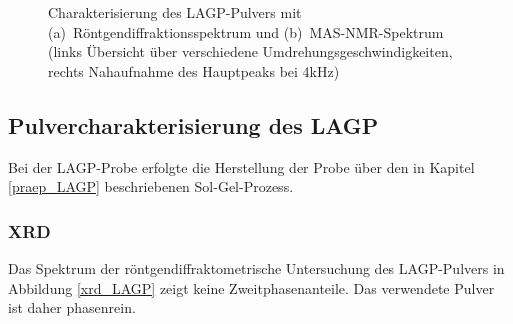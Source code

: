 \documentclass[a4paper, 11pt, headsepline,footsepline,twoside,abstract]{scrbook}
\begin{document}
\begin{figure}
   \centering
       \vspace{6mm}
       \vspace{3mm}
	\caption{Charakterisierung des LAGP-Pulvers mit (a)~Röntgen\-diffraktionsspektrum und (b)~MAS-NMR-Spektrum (links Übersicht über verschiedene Umdrehungsgeschwindigkeiten, rechts Nahaufnahme des Hauptpeaks bei 4kHz)}
   	\label{pulver_LAGP}
\end{figure}
\subsection{Pulvercharakterisierung des LAGP}
Bei der LAGP-Probe erfolgte die Herstellung der Probe über den in Kapitel \ref{praep_LAGP} beschriebenen Sol-Gel-Prozess. 
\subsubsection{XRD}
Das Spektrum der röntgendiffraktometrische Untersuchung des LAGP-Pulvers in Abbildung \ref{xrd_LAGP} zeigt keine Zweitphasenanteile. Das verwendete Pulver ist daher phasenrein.
\end{document}
